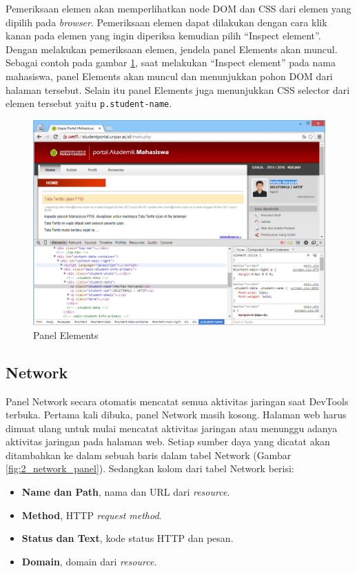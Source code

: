 Pemeriksaan elemen akan memperlihatkan node DOM dan CSS dari elemen yang dipilih pada \textit{browser}. Pemeriksaan elemen dapat dilakukan dengan cara klik kanan pada elemen yang ingin diperiksa kemudian pilih ``Inspect element''. Dengan melakukan pemeriksaan elemen, jendela panel Elements akan muncul. Sebagai contoh pada gambar \ref{fig:2_elements_panel}, saat melakukan ``Inspect element'' pada nama mahasiswa, panel Elements akan muncul dan menunjukkan pohon DOM dari halaman tersebut. Selain itu panel Elements juga menunjukkan CSS selector dari elemen tersebut yaitu \texttt{p.student-name}.

\begin{figure}[H]
	\centering
	\includegraphics[scale=0.5]{Gambar/elements-panel}
	\caption{Panel Elements} 
	\label{fig:2_elements_panel}
\end{figure}

\subsection{Network}
Panel Network secara otomatis mencatat semua aktivitas jaringan saat DevTools terbuka. Pertama kali dibuka, panel Network masih kosong. Halaman web harus dimuat ulang untuk mulai mencatat aktivitas jaringan atau menunggu adanya aktivitas jaringan pada halaman web. Setiap sumber daya yang dicatat akan ditambahkan ke dalam sebuah baris dalam tabel Network (Gambar \ref{fig:2_network_panel}). Sedangkan kolom dari tabel Network berisi:
\begin{itemize}
	\item \textbf{Name dan Path}, nama dan URL dari \textit{resource}.
	\item \textbf{Method}, HTTP \textit{request method}.
	\item \textbf{Status dan Text}, kode status HTTP dan pesan.
	\item \textbf{Domain}, domain dari \textit{resource}.
\end{itemize}

